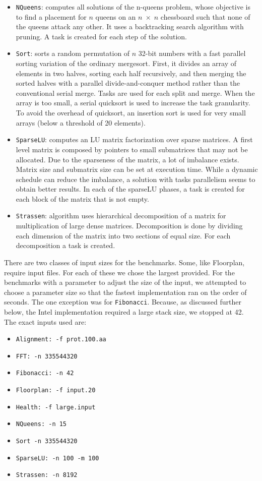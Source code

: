 \documentclass[sigconf]{acmart}
\begin{document}
\begin{itemize}
\item \texttt{NQueens}: computes  all  solutions  of  the n-queens
problem, whose objective is to find a placement for $n$ queens on an $n \;
\times \; n$ chessboard such that none of the queens attack any other. It uses
a backtracking search algorithm with pruning. A task is created for each step
of the solution.
\item \texttt{Sort}: sorts a random permutation of $n$ 32-bit numbers with  a
fast  parallel  sorting  variation of  the  ordinary mergesort.  First, it
divides an array of elements in two halves, sorting  each half  recursively,
and  then  merging  the  sorted halves with a parallel divide-and-conquer
method rather than the  conventional  serial  merge.  Tasks are  used  for
each  split and merge. When the array is too small, a serial quicksort is used
to increase  the  task  granularity.  To  avoid  the overhead of  quicksort, an
insertion  sort  is  used  for  very  small  arrays (below a threshold of 20
elements).
\item \texttt{SparseLU}: computes an LU matrix factorization over
sparse matrices. A first level matrix is composed by pointers to  small
submatrices  that  may  not  be  allocated.  Due  to  the sparseness  of  the
matrix,  a  lot  of  imbalance  exists.  Matrix size and submatrix size can be
set at execution time. While a dynamic schedule can reduce the imbalance, a
solution with tasks parallelism seems to obtain better results. In each
of the sparseLU  phases,  a  task  is  created  for  each  block  of  the
matrix that is not empty.
\item \texttt{Strassen}: algorithm  uses  hierarchical  decomposition of a
matrix for multiplication of large dense matrices. Decomposition is done by
dividing each dimension of the matrix into  two  sections  of  equal size. For
each decomposition a task is created. 
\end{itemize}

There are two classes of input sizes for the benchmarks. Some, like Floorplan,
require input files. For each of these we chose the largest provided. For the
benchmarks with a parameter to adjust the size of the input, we attempted to 
choose a parameter size so that the fastest implementation ran on the order of
seconds. The one exception was for \texttt{Fibonacci}. Because, as discussed
further below, the Intel implementation required a large stack size, we stopped at
42. The exact inputs used are:

\begin{itemize}
\item \texttt{Alignment: -f prot.100.aa} 
\item \texttt{FFT: -n 335544320}
\item \texttt{Fibonacci: -n 42}
\item \texttt{Floorplan: -f input.20}
\item \texttt{Health: -f large.input}
\item \texttt{NQueens: -n 15}
\item \texttt{Sort -n 335544320}
\item \texttt{SparseLU: -n 100 -m 100}
\item \texttt{Strassen: -n 8192}
\end{itemize}
\end{document}
